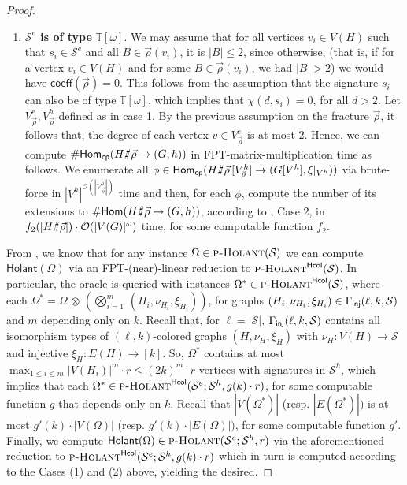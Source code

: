 \documentclass[authorcolumns,numberwithinsect]{no-lipics-v2022}
\newcommand{\homs}[2]{\mathsf{Hom}(#1 \to #2)}
\def\fracture#1#2{\ensuremath{#1\raisebox{.2ex}{\rotatebox[origin=c]{-15}{$\sharp$}}#2}}
\newcommand{\holantprob}{\text{\sc{p-Holant}}}
\newcommand{\holantprobstar}{\text{\sc{p-Holant}}^{\mathsf{Hcol}}}
\newcommand{\homscp}{\mathsf{Hom}_{\mathsf{cp}}}
\newcommand{\holant}{\mathsf{Holant}}
\def\fracture#1#2{\ensuremath{#1\raisebox{.2ex}{\rotatebox[origin=c]{-15}{$\sharp$}}#2}}
\begin{document}
\begin{proof}
\begin{enumerate}
    \item \textbf{$\mathcal{S}^e$ is of type} $\mathbb{T}[\omega]$. We may assume that for all vertices $v_i \in V(H)$ such that $s_i \in \mathcal{S}^e$ and all $B \in \vec{\rho}(v_i)$, it is $|B| \leq 2$, since otherwise, (that is, if for a vertex $v_i \in V(H)$ and for some $B \in \vec{\rho}(v_i)$, we had $|B| > 2$) we would have $\mathsf{coeff}(\vec{\rho}) = 0$. This follows from the assumption that the signature $s_i$ can also be of type $\mathbb{T}[\omega]$, which implies that $\chi(d, s_i) = 0$, for all $d > 2$. Let $V^e_{\vec{\rho}}, V^h_{\vec{\rho}}$ defined as in case 1. By the previous assumption on the fracture $\vec{\rho}$, it follows that, the degree of each vertex $v \in V^e_{\vec{\rho}}$ is at most 2. Hence, we can compute $\#\homscp(\fracture{H}{\vec{\rho}} \to (G,h))$ in FPT-matrix-multiplication time as follows. We enumerate all $\phi \in \homscp(\fracture{H}{\vec{\rho}}\,[V^h_{\vec{\rho}}] \to (G[V^h],\xi|_{V^h}))$ via brute-force in $|V^h|^{\mathcal{O}(|V_{\vec{\rho}}^h|)}$ time and then, for each $\phi$, compute the number of its extensions to $\#\homs{\fracture{H}{\vec{\rho}}}{(G,h)}$, according to , Case 2, in $f_2(|\fracture{H}{\vec{\rho}}|)\cdot\mathcal{O}(|V(G)|^\omega)$ time, for some computable function $f_2$.
\end{enumerate}


From , we know that for any instance $\Omega \in \holantprob(\mathcal{S})$ we can compute $\holant(\Omega)$ via an FPT-(near)-linear reduction to $\holantprobstar(\mathcal{S})$. In particular, the oracle is queried with instances $\Omega^* \in \holantprobstar(\mathcal{S})$, where each $\Omega^* = \Omega\,\otimes\,\left(\bigotimes_{i=1}^{m}\,(H_i, \nu_{H_i}, \xi_{H_i})\right)$, for graphs $(H_i, \nu_{H_i}, \xi_{H_i}) \in \Gamma_{\text{\sf{inj}}}(\ell, k, \mathcal{S})$ and $m$ depending only on $k$. Recall that, for $\ell = |\mathcal{S}|$, $\Gamma_{\text{\sf{inj}}}(\ell, k, \mathcal{S})$ contains all isomorphism types of $(\ell, k)$-colored graphs $(H, \nu_H, \xi_H)$ with $\nu_H : V(H) \to \mathcal{S}$ and injective $\xi_H : E(H) \to [k]$. So, $\Omega^*$ contains at most $\max_{1\leq i\leq m}|V(H_i)|^m\cdot r \leq (2k)^m\cdot r$ vertices with signatures in $\mathcal{S}^h$, which implies that each $\Omega^* \in \holantprobstar(\mathcal{S}^e; \mathcal{S}^h, g(k)\cdot r)$, for some computable function $g$ that depends only on $k$. Recall that $|V(\Omega^*)|$ (resp. $|E(\Omega^*)|)$ is at most $g'(k)\cdot|V(\Omega)|$ (resp. $g'(k)\cdot|E(\Omega)|)$, for some computable function $g'$. Finally, we compute $\holant(\Omega) \in \holantprob(\mathcal{S}^e;\mathcal{S}^h, r)$ via the aforementioned reduction to $\holantprobstar(\mathcal{S}^e; \mathcal{S}^h, g(k)\cdot r)$ which in turn is computed according to the Cases (1) and (2) above, yielding the desired.
\end{proof}
\end{document}
